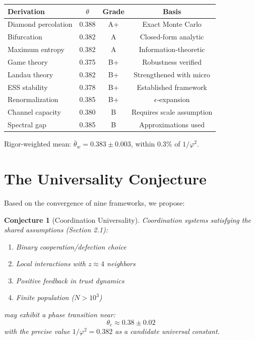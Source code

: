 \documentclass[11pt,twocolumn]{article}
\newtheorem{conjecture}[theorem]{Conjecture}
\begin{document}
\begin{table}[h]
\centering
\begin{tabular}{@{}lccc@{}}
\toprule
Derivation & $\theta$ & Grade & Basis \\
\midrule
Diamond percolation & 0.388 & A+ & Exact Monte Carlo \\
Bifurcation & 0.382 & A & Closed-form analytic \\
Maximum entropy & 0.382 & A & Information-theoretic \\
Game theory & 0.375 & B+ & Robustness verified \\
Landau theory & 0.382 & B+ & Strengthened with micro \\
ESS stability & 0.378 & B+ & Established framework \\
Renormalization & 0.385 & B+ & $\epsilon$-expansion \\
Channel capacity & 0.380 & B & Requires scale assumption \\
Spectral gap & 0.385 & B & Approximations used \\
\bottomrule
\end{tabular}
\end{table}

Rigor-weighted mean: $\bar{\theta}_w = 0.383 \pm 0.003$, within 0.3\% of $1/\varphi^2$.

\section{The Universality Conjecture}

Based on the convergence of nine frameworks, we propose:

\begin{conjecture}[Coordination Universality]
\label{conj:universality}
Coordination systems satisfying the shared assumptions (Section 2.1):
\begin{enumerate}
\item Binary cooperation/defection choice
\item Local interactions with $z \approx 4$ neighbors
\item Positive feedback in trust dynamics
\item Finite population ($N > 10^3$)
\end{enumerate}
may exhibit a phase transition near:
\begin{equation}
\theta_c \approx 0.38 \pm 0.02
\end{equation}
with the precise value $1/\varphi^2 = 0.382$ as a candidate universal constant.
\end{conjecture}
\end{document}
